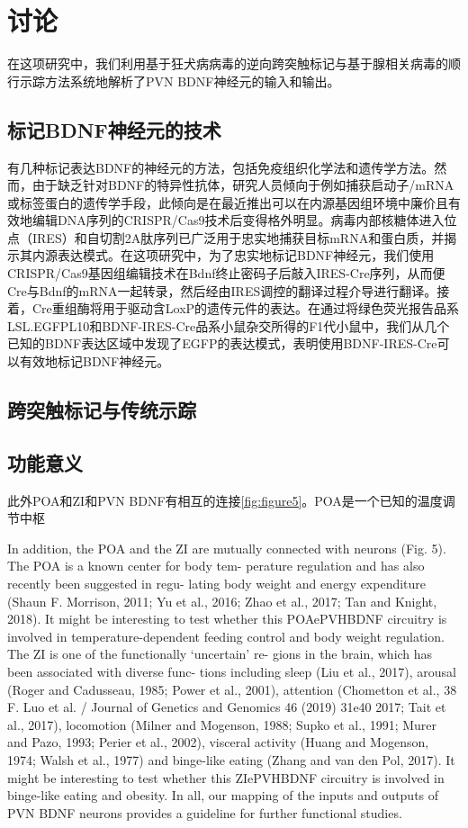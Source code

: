 \chapter{讨论}\label{chap:discussion}
在这项研究中，我们利用基于狂犬病病毒的逆向跨突触标记与基于腺相关病毒的顺行示踪方法系统地解析了PVN BDNF神经元的输入和输出。

\section{标记BDNF神经元的技术}
有几种标记表达BDNF的神经元的方法，包括免疫组织化学法和遗传学方法。然而，由于缺乏针对BDNF的特异性抗体，研究人员倾向于例如捕获启动子/mRNA或标签蛋白的遗传学手段，此倾向是在最近推出可以在内源基因组环境中廉价且有效地编辑DNA序列的CRISPR/Cas9技术后\citep{ran2013genome, doudna2014new}变得格外明显。病毒内部核糖体进入位点（IRES）和自切割2A肽序列已广泛用于忠实地捕获目标mRNA和蛋白质，并揭示其内源表达模式\citep{vong2011leptin, daigle2018suite}。在这项研究中，为了忠实地标记BDNF神经元，我们使用CRISPR/Cas9基因组编辑技术在Bdnf终止密码子后敲入IRES-Cre序列，从而便Cre与Bdnf的mRNA一起转录，然后经由IRES调控的翻译过程介导进行翻译。接着，Cre重组酶将用于驱动含LoxP的遗传元件的表达。在通过将绿色荧光报告品系LSL.EGFPL10和BDNF-IRES-Cre品系小鼠杂交所得的F1代小鼠中，我们从几个已知的BDNF表达区域中发现了EGFP的表达模式，表明使用BDNF-IRES-Cre可以有效地标记BDNF神经元。

\section{跨突触标记与传统示踪}


\section{功能意义}


此外POA和ZI和PVN BDNF有相互的连接\figurename{\ref{fig:figure5}}。POA是一个已知的温度调节中枢


In addition, the POA and the ZI are mutually connected with  neurons (Fig. 5). The POA is a known center for body tem- perature regulation and has also recently been suggested in regu- lating body weight and energy expenditure (Shaun F. Morrison, 2011; Yu et al., 2016; Zhao et al., 2017; Tan and Knight, 2018). It might be interesting to test whether this POAePVHBDNF circuitry is involved in temperature-dependent feeding control and body weight regulation. The ZI is one of the functionally ‘uncertain’ re- gions in the brain, which has been associated with diverse func- tions including sleep (Liu et al., 2017), arousal (Roger and Cadusseau, 1985; Power et al., 2001), attention (Chometton et al.,
38 F. Luo et al. / Journal of Genetics and Genomics 46 (2019) 31e40
2017; Tait et al., 2017), locomotion (Milner and Mogenson, 1988; Supko et al., 1991; Murer and Pazo, 1993; Perier et al., 2002), visceral activity (Huang and Mogenson, 1974; Walsh et al., 1977) and binge-like eating (Zhang and van den Pol, 2017). It might be interesting to test whether this ZIePVHBDNF circuitry is involved in binge-like eating and obesity. In all, our mapping of the inputs and outputs of PVN BDNF neurons provides a guideline for further functional studies.


